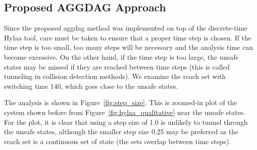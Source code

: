 \subsection{Proposed AGGDAG Approach}

Since the proposed aggdag method was implemented on top of the discrete-time Hylaa tool, care must be taken to ensure that a proper time step is chosen.
%
If the time step is too small, too many steps will be necessary and the analysis time can become excessive.
%
On the other hand, if the time step is too large, the unsafe states may be missed if they are reached between time steps
(this is called tunneling in collision detection methods).
%
We examine the reach set with switching time 140, which goes close to the unsafe states.

The analysis is shown in Figure~\ref{fig:step_size}.
%
This is zoomed-in plot of the system shown before from Figure~\ref{fig:hylaa_qualitative} near the unsafe states.
%
For the plot, it is clear that using a step size of 1.0 is unlikely to tunnel through the unsafe states,
although the smaller step size 0.25 may be preferred as the
reach set is a continuous set of state (the sets overlap between time steps).

